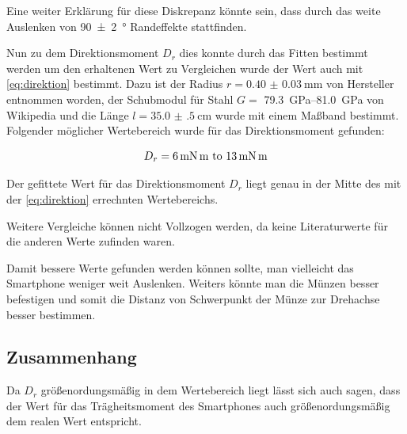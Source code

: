 \documentclass[11pt,ngerman]{scrartcl}
\begin{document}
Eine weiter Erklärung für diese Diskrepanz könnte sein, dass durch das weite
Auslenken von \SI{90(2)}{\degree} Randeffekte stattfinden.

Nun zu dem Direktionsmoment $D_r$ dies konnte durch das Fitten bestimmt werden
um den erhaltenen Wert zu Vergleichen wurde der Wert auch mit
\autoref{eq:direktion} bestimmt.  Dazu ist der Radius $r=\SI{0.40(3)}{\mm}$ von
Hersteller \cite{stahldraht} entnommen worden, der Schubmodul für Stahl
$G=$ \SIrange{79.3}{81.0}{\GPa} von Wikipedia \cite{wikiSchubStahl} und
die Länge $l=\SI{35.0(5)}{\cm}$ wurde mit einem Maßband bestimmt.
Folgender möglicher Wertebereich wurde für das Direktionsmoment
gefunden:

\begin{equation}
    D_r = \text{\SIrange{6}{13}{\mN\m}}
\end{equation}

Der gefittete Wert für das Direktionsmoment $D_r$ liegt genau in
der Mitte des mit der \autoref{eq:direktion} errechnten Wertebereichs.

Weitere Vergleiche können nicht Vollzogen werden, da keine
Literaturwerte für die anderen Werte zufinden waren.

Damit bessere Werte gefunden werden können sollte,
man vielleicht das Smartphone weniger weit Auslenken.
Weiters könnte man die Münzen besser befestigen und
somit die Distanz von Schwerpunkt der Münze zur
Drehachse besser bestimmen.

\subsection{Zusammenhang}

Da $D_r$ größenordungsmäßig in dem Wertebereich liegt
lässt sich auch sagen, dass der Wert für das Trägheitsmoment
des Smartphones auch größenordungsmäßig dem realen Wert entspricht.

\newpage
\printbibliography

\listoffigures

\listoftables
\end{document}
